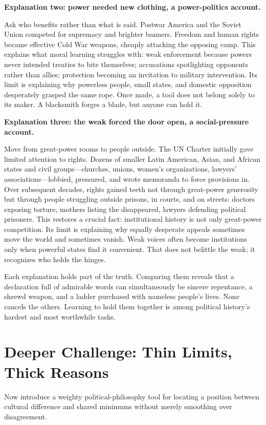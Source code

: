 \textbf{Explanation two: power needed new clothing, a power-politics account.}

Ask who benefits rather than what is said. Postwar America and the Soviet Union competed for supremacy and brighter banners. Freedom and human rights became effective Cold War weapons, cheaply attacking the opposing camp. This explains what moral learning struggles with: weak enforcement because powers never intended treaties to bite themselves; accusations spotlighting opponents rather than allies; protection becoming an invitation to military intervention. Its limit is explaining why powerless people, small states, and domestic opposition desperately grasped the same rope. Once made, a tool does not belong solely to its maker. A blacksmith forges a blade, but anyone can hold it.

\textbf{Explanation three: the weak forced the door open, a social-pressure account.}

Move from great-power rooms to people outside. The UN Charter initially gave limited attention to rights. Dozens of smaller Latin American, Asian, and African states and civil groups---churches, unions, women's organizations, lawyers' associations---lobbied, pressured, and wrote memoranda to force provisions in. Over subsequent decades, rights gained teeth not through great-power generosity but through people struggling outside prisons, in courts, and on streets: doctors exposing torture, mothers listing the disappeared, lawyers defending political prisoners. This restores a crucial fact: institutional history is not only great-power competition. Its limit is explaining why equally desperate appeals sometimes move the world and sometimes vanish. Weak voices often become institutions only when powerful states find it convenient. That does not belittle the weak; it recognizes who holds the hinges.

Each explanation holds part of the truth. Comparing them reveals that a declaration full of admirable words can simultaneously be sincere repentance, a shrewd weapon, and a ladder purchased with nameless people's lives. None cancels the others. Learning to hold them together is among political history's hardest and most worthwhile tasks.

\section{Deeper Challenge: Thin Limits, Thick Reasons}
Now introduce a weighty political-philosophy tool for locating a position between cultural difference and shared minimums without merely smoothing over disagreement.

